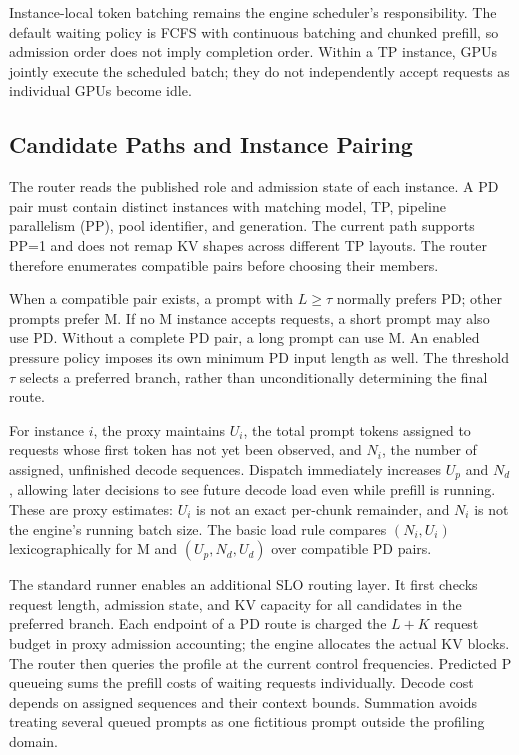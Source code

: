 \documentclass[11pt,a4paper,twocolumn]{article}
\begin{document}
Instance-local token batching remains the engine scheduler's
responsibility. The default waiting policy is FCFS with
continuous batching and chunked prefill, so admission order
does not imply completion order. Within a TP instance, GPUs
jointly execute the scheduled batch; they do not independently
accept requests as individual GPUs become idle.

\subsection{Candidate Paths and Instance Pairing}

The router reads the published role and admission state of
each instance. A PD pair must contain distinct instances with
matching model, TP, pipeline parallelism (PP), pool identifier,
and generation. The current path supports PP=1 and does not
remap KV shapes across different TP layouts. The router
therefore enumerates compatible pairs before choosing their
members.

When a compatible pair exists, a prompt with $L\ge\tau$
normally prefers PD; other prompts prefer M. If no M instance
accepts requests, a short prompt may also use PD. Without a
complete PD pair, a long prompt can use M. An enabled pressure
policy imposes its own minimum PD input length as well.
The threshold $\tau$ selects a preferred branch, rather than
unconditionally determining the final route.

For instance $i$, the proxy maintains $U_i$, the total prompt
tokens assigned to requests whose first token has not yet
been observed, and $N_i$, the number of assigned, unfinished
decode sequences. Dispatch immediately increases $U_p$ and
$N_d$, allowing later decisions to see future decode load
even while prefill is running. These are proxy estimates:
$U_i$ is not an exact per-chunk remainder, and $N_i$ is not
the engine's running batch size. The basic load rule compares
$(N_i,U_i)$ lexicographically for M and $(U_p,N_d,U_d)$ over
compatible PD pairs.

The standard runner enables an additional SLO routing layer.
It first checks request length, admission state, and KV
capacity for all candidates in the preferred branch.
Each endpoint of a PD route is charged the $L+K$ request
budget in proxy admission accounting; the engine allocates
the actual KV blocks. The router then queries the profile at
the current control frequencies. Predicted P queueing sums
the prefill costs of waiting requests individually. Decode
cost depends on assigned sequences and their context bounds.
Summation avoids treating several queued prompts as one
fictitious prompt outside the profiling domain.
\end{document}
